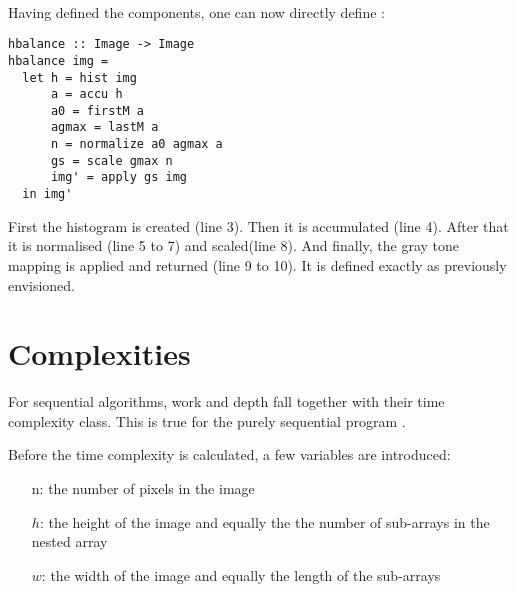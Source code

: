   \paragraph{\algo}
  Having defined the components, one can now directly define \seq:
  \begin{lstlisting}
hbalance :: Image -> Image
hbalance img =
  let h = hist img
      a = accu h
      a0 = firstM a
      agmax = lastM a
      n = normalize a0 agmax a
      gs = scale gmax n
      img' = apply gs img
  in img'
  \end{lstlisting}
  First the histogram is created (line 3). Then it is accumulated (line 4).
  After that it is normalised (line 5 to 7) and scaled(line 8).
  And finally, the gray tone mapping is applied and returned (line 9 to 10).
  It is defined exactly as previously envisioned.
  
\section{Complexities}
  For sequential algorithms, work and depth fall
  together with their time complexity class.
  This is true for the purely sequential
  program \seq.
  
  Before the time complexity is calculated, 
  a few variables are introduced:
  \begin{itemize}
    \item[n:] the number of pixels in the image
    \item[$h$:] the height of the image and equally the
              the number of sub-arrays in the nested array
    \item[$w$:] the width of the image and
              equally the length of the sub-arrays
  \end{itemize}
  
